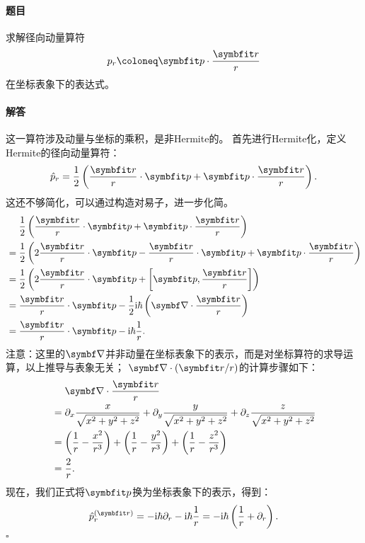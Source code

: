 \begin{tcolorbox}[breakable, title={\textbf{例题：径向动量算符}}]
    \paragraph{题目}
    求解径向动量算符
    \begin{equation}
        p_r \coloneq \pp \cdot \frac{\rr}{r}
    \end{equation}
    在坐标表象下的表达式。

    \paragraph{解答}
    这一算符涉及动量与坐标的乘积，是非Hermite的。
    首先进行Hermite化，定义Hermite的径向动量算符：
    \begin{equation}
        \hat{p}_r = \frac12 \left( \frac{\rr}{r}\cdot\pp + \pp\cdot\frac{\rr}{r} \right).
    \end{equation}
    这还不够简化，可以通过构造对易子，进一步化简。
    \begin{equation}
    \begin{aligned}
        &\quad\ \frac12 \left( \frac{\rr}{r}\cdot\pp + \pp\cdot\frac{\rr}{r} \right) \\
        &= \frac12 \left( 2\frac{\rr}{r}\cdot\pp - \frac{\rr}{r}\cdot\pp + \pp\cdot\frac{\rr}{r} \right) \\
        &= \frac12 \left( 2\frac{\rr}{r}\cdot\pp + \left[\pp, \frac{\rr}{r}\right] \right) \\
        &= \frac{\rr}{r}\cdot\pp - \frac12\ii\hbar\left(\del\cdot\frac{\rr}{r}\right) \\
        &= \frac{\rr}{r}\cdot\pp - \ii\hbar\frac{1}{r}.
    \end{aligned}
    \end{equation}
    注意：这里的$\del$并非动量在坐标表象下的表示，而是对坐标算符的求导运算，以上推导与表象无关；
    $\del\cdot(\rr/r)$的计算步骤如下：
    \begin{equation}
    \begin{aligned}
        &\quad\ \del\cdot\frac{\rr}{r} \\
        &= \pd_x \frac{x}{\sqrt{x^2+y^2+z^2}} + \pd_y \frac{y}{\sqrt{x^2+y^2+z^2}} + \pd_z \frac{z}{\sqrt{x^2+y^2+z^2}} \\
        &= \left(\frac{1}{r} - \frac{x^2}{r^3}\right) + \left(\frac{1}{r} - \frac{y^2}{r^3}\right) + \left(\frac{1}{r} - \frac{z^2}{r^3}\right) \\
        &= \frac{2}{r}.
    \end{aligned}
    \end{equation}
    现在，我们正式将$\pp$换为坐标表象下的表示，得到：
    \begin{equation}
        \hat{p}^{(\rr)}_r = -\ii\hbar\pd_r - \ii\hbar\frac{1}{r} = -\ii\hbar\left(\frac{1}{r}+\pd_r\right).
    \end{equation}
    \hfill$\square$

\end{tcolorbox}
